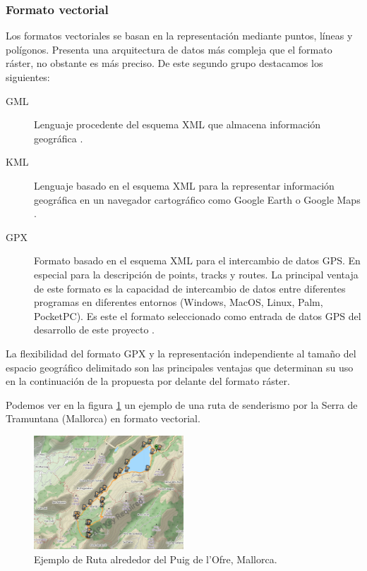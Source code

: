 \subsubsection{Formato vectorial}
Los formatos vectoriales se basan en la representación mediante puntos, líneas y 
polígonos. Presenta una arquitectura de datos más compleja que el formato ráster, no 
obstante es más preciso. De este segundo grupo destacamos los siguientes:
\begin{description}
\item [\ac{GML}] Lenguaje procedente del esquema \ac{XML} que almacena 
información geográfica 
\cite{OGC01}.
\item[\ac{KML}] Lenguaje basado en el esquema \ac{XML} para la representar 
información 
geográfica en un navegador cartográfico como Google Earth o Google Maps 
\cite{OGC02}.
\item[\ac{GPX}]Formato basado en el esquema \ac{XML} para el intercambio de datos 
\ac{GPS}. 
En especial para la descripción de points, tracks y routes. La principal ventaja  de este 
formato es la capacidad de intercambio de datos entre diferentes  programas en 
diferentes entornos (Windows, MacOS, Linux, Palm, PocketPC). Es este el formato 
seleccionado como entrada de datos \ac{GPS} del desarrollo de este proyecto 
\cite{Topografix01}.
\end{description}
La flexibilidad del formato \ac{GPX} y la representación independiente al tamaño del 
espacio geográfico delimitado son las principales ventajas que determinan su uso en la 
continuación de la propuesta por delante del formato ráster.

Podemos ver en la figura \ref{figure:PuigOfre} un ejemplo de una ruta de senderismo 
por la Serra de Tramuntana (Mallorca) en formato vectorial.
\begin{figure}[!htb]
\begin{center}
\includegraphics[width=0.5\textwidth]{./Imagenes/RutaOfre.png}
\caption{Ejemplo de Ruta alrededor del Puig de l'Ofre, Mallorca.}
\label{figure:PuigOfre}
\end{center}
\end{figure}
\newpage


